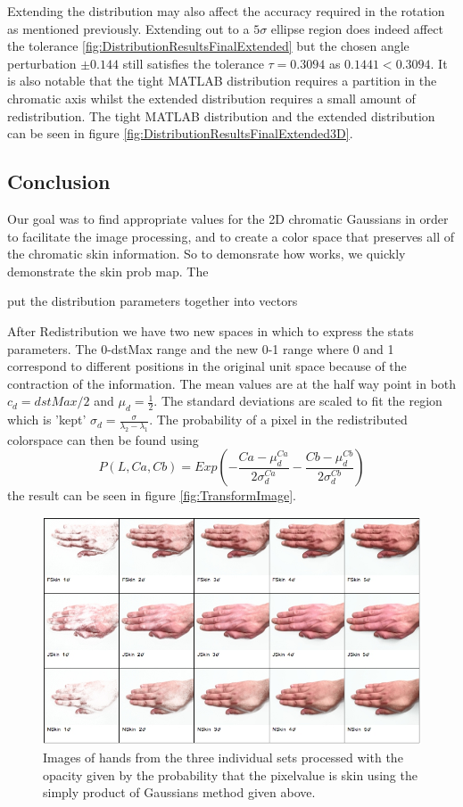 Extending the distribution may also affect the accuracy required in the rotation as mentioned previously. Extending out to a $5\sigma$ ellipse region does indeed affect the tolerance \ref{fig:DistributionResultsFinalExtended} but the chosen angle perturbation $\pm0.144$ still satisfies the tolerance $\tau = 0.3094$ as $0.1441 < 0.3094$. It is also notable that the tight MATLAB distribution requires a  partition in the chromatic axis whilst the extended distribution requires a small amount of redistribution. The tight MATLAB distribution and the extended distribution can be seen in figure \ref{fig:DistributionResultsFinalExtended3D}.

\subsection{Conclusion}

Our goal was to find appropriate values for the 2D chromatic Gaussians in order to facilitate the image processing, and to create a color space that preserves all of the chromatic skin information. So to demonsrate how works, we quickly demonstrate the skin prob map. 
The 


put the distribution parameters together into vectors

After Redistribution we have two new spaces in which to express the stats parameters. The 0-dstMax range and the new 0-1 range where 0 and 1 correspond to different positions in the original unit space because of the contraction of the information. The mean values are at the half way point in both $c_d=dstMax/2$ and $\mu_d = \frac{1}{2}$.  The standard deviations are scaled to fit the region which is 'kept' $\sigma_d=\frac{\sigma}{\lambda_2-\lambda_1}$. The probability of a pixel in the redistributed colorspace can then be found using 
\begin{equation}
P(L,Ca,Cb) = Exp(- \frac{Ca-\mu_d^{Ca} }{2 \sigma_d^{Ca}} - \frac{Cb-\mu_d^{Cb} }{2 \sigma_d^{Cb}})
\end{equation}
the result can be seen in figure \ref{fig:TransformImage}.
\begin{figure}[h!]
  \centering
  \includegraphics[width=0.95 \textwidth]{Chapter3/Figs/TransformImages.jpg} 
    \caption{ Images of hands from the three individual sets processed with the opacity given by the probability that the pixelvalue is skin using the simply product of Gaussians method given above.}  \label{fig:TransformImages}
\end{figure}